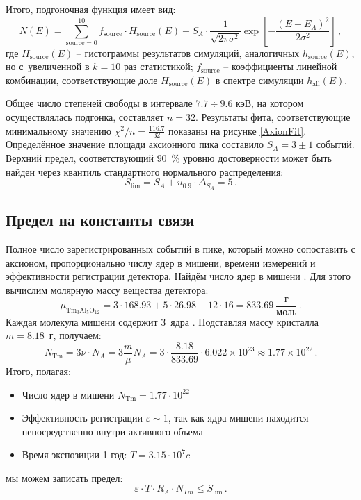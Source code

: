 \documentclass[a4paper,article,14pt]{extarticle}
\begin{document}
Итого, подгоночная функция имеет вид:
\begin{equation}
    N(E) =
        \sum\limits_{\mathrm{source} = 0}^{10}
        f_\mathrm{source} \cdot H_\mathrm{source} (E) +
        S_A \cdot \frac{1}{\sqrt{2\pi \sigma^2} }
        \exp \left[
            - \frac{(E - {E_A})^2}{2 \sigma^2}
        \right]\, ,
\end{equation}
где $H_\mathrm{source}(E)$ -- гистограммы результатов симуляций, аналогичных $h_\mathrm{source}(E)$, но с~увеличенной в $k=10$ раз статистикой; $f_\mathrm{source}$ -- коэффициенты линейной комбинации, соответствующие доле $H_\mathrm{source}(E)$ в спектре симуляции $h_\mathrm{all} (E)$.

Общее число степеней свободы в интервале $7.7 \div 9.6$ кэВ, на котором осуществлялась подгонка, составляет $n = 32$.
Результаты фита, соответствующие минимальному значению $\chi^2 /n = \frac{116.7}{32}$ показаны на рисунке \ref{AxionFit}.
Определённое значение площади аксионного пика составило $S_A = 3 \pm 1$ событий.
Верхний предел, соответствующий $90$~\% уровню достоверности может быть найден через квантиль стандартного нормального распределения:
\begin{equation}
    S_\mathrm{lim} = S_A + u_{0.9} \cdot \Delta_{S_A} = 5\, .
\end{equation}

\subsection{Предел на константы связи}
Полное число зарегистрированных событий в пике, который можно сопоставить с аксионом, пропорционально числу ядер {\Tm} в мишени, времени измерений и эффективности регистрации детектора.
Найдём число ядер в мишени {\Tm}.
Для этого вычислим молярную массу вещества детектора:
\begin{equation}
    \mu_{\mathrm{Tm}_3 \mathrm{Al}_5 \mathrm{O}_{12}} =
        3 \cdot 168.93 + 5 \cdot 26.98 + 12 \cdot 16 =
        833.69\ \frac{\text{г}}{{\text{моль}}}\, .
\end{equation}
Каждая молекула мишени содержит $3$~ядра {\Tm}.
Подставляя массу кристалла $m = 8.18$~г, получаем:
\begin{equation}
    N_\mathrm{Tm} =
        3\nu \cdot N_A = 3 \frac{m}{\mu } N_A =
        3 \cdot \frac{8.18}{833.69} \cdot 6.022 \times {10^{23}} \approx
        1.77 \times {10^{22}}\, .
\end{equation}
Итого, полагая:
\begin{itemize}
    \item Число ядер в мишени $N_\mathrm{Tm} = 1.77 \cdot {10^{22}}$
    \item Эффективность регистрации $\varepsilon \sim 1 $, так как ядра мишени находится непосредственно внутри активного объема
    \item Время экспозиции 1 год: $T = 3.15 \cdot {10^7} c$
\end{itemize}
мы можем записать предел:
\begin{equation}
    \varepsilon \cdot T \cdot {R_A} \cdot N_{Tm} \leqslant
        {S_\mathrm{\lim }}\, .
\end{equation}
\end{document}
